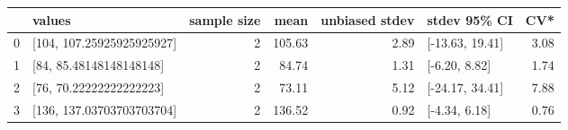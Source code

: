 \begin{tabular}{llrrrlr}
\toprule
 & values & sample size & mean & unbiased stdev & stdev 95\% CI & CV* \\
\midrule
0 & [104, 107.25925925925927] & 2 & 105.63 & 2.89 & [-13.63, 19.41] & 3.08 \\
1 & [84, 85.48148148148148] & 2 & 84.74 & 1.31 & [-6.20, 8.82] & 1.74 \\
2 & [76, 70.22222222222223] & 2 & 73.11 & 5.12 & [-24.17, 34.41] & 7.88 \\
3 & [136, 137.03703703703704] & 2 & 136.52 & 0.92 & [-4.34, 6.18] & 0.76 \\
\bottomrule
\end{tabular}
